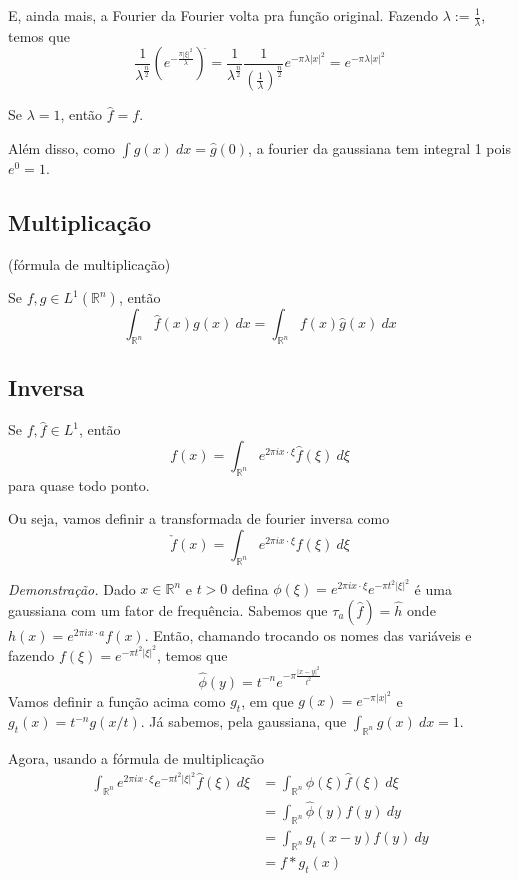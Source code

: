 \documentclass[11pt]{article}
\newcommand{\Rn}{{\mathbb{R}^n}}
\newcommand{\parentesis}[1]{\left(#1\right)}
\begin{document}
E, ainda mais, a Fourier da Fourier volta pra função original. Fazendo \(\lambda := \frac{1}{\lambda}\), temos que \[\frac{1}{\lambda^{\frac{n}{2}}}\left(e^{-\frac{\pi |\xi|^2}{\lambda}}\right)^{\hat{}} =\frac{1}{\lambda^{\frac{n}{2}}} \frac{1}{\parentesis{\frac{1}{\lambda}}^{\frac{n}{2}}} e^{-\pi \lambda |x|^2} = e^{-\pi \lambda |x|^2}\]

Se \(\lambda=1\), então \(\hat{f}=f\).

Além disso, como \(\int g(x)\ dx = \hat{g}(0)\), a fourier da gaussiana tem integral 1 pois \(e^0 = 1\).



\subsection{Multiplicação} (fórmula de multiplicação)

Se \(f,g \in L^1 (\Rn)\), então \[\int_\Rn \hat{f}(x) g(x)\ dx = \int_\Rn f(x) \hat{g}(x)\ dx\]

\subsection{Inversa}

Se \(f, \hat{f} \in L^1\), então \[f(x) = \int_\Rn e^{2\pi i x \cdot \xi } \hat{f}(\xi)\ d\xi\] para quase todo ponto.

Ou seja, vamos definir a transformada de fourier inversa como \[\check{f}(x)=\int_\Rn e^{2\pi i x \cdot \xi } f(\xi)\ d\xi\]

\textit{Demonstração.} Dado \(x \in \Rn\) e \(t>0\) defina \(\phi(\xi)=e^{2\pi i x \cdot \xi} e^{-\pi t^2 |\xi|^2}\) é uma gaussiana com um fator de frequência. Sabemos que \( \tau_a (\hat{f}) = \hat{h}\) onde \(h(x) = e^{2\pi i x \cdot a}  f(x)  \). Então, chamando trocando os nomes das variáveis e fazendo \(f(\xi)=e^{-\pi t^2 |\xi|^2}\), temos que  \[\hat{\phi}(y) = t^{-n} e^{-\pi \frac{|x-y|^2}{t^2}}\] Vamos definir a função acima como \(g_t\), em que \(g(x)=e^{-\pi |x|^2}\) e \(g_t(x) = t^{-n} g(x/t)\). Já sabemos, pela gaussiana, que \(\int_\Rn g(x)\ dx = 1\).

Agora, usando a fórmula de multiplicação \begin{align*}
	\int_\Rn e^{2\pi i x \cdot \xi} e^{-\pi t^2 |\xi|^2} \hat{f} (\xi)\ d \xi &= \int_\Rn \phi(\xi) \hat{f}(\xi)\ d\xi \\
	&= \int_\Rn \hat{\phi}(y) f(y)\ dy \\
	&= \int_\Rn g_t(x-y) f(y)\ dy \\
	&= f * g_t(x)
\end{align*}
\end{document}
